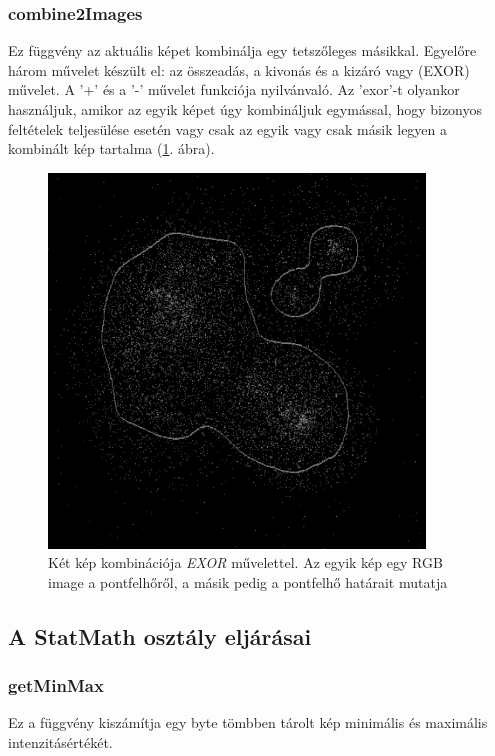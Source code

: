 \documentclass[a4paper,12pt]{article}
\begin{document}
\subsubsection{combine2Images}

Ez függvény az aktuális képet kombinálja egy tetszőleges másikkal. Egyelőre három művelet készült el: az összeadás, a kivonás és a kizáró vagy (EXOR) művelet. A '+' és a '-' művelet funkciója nyilvánvaló. Az 'exor'-t olyankor használjuk, amikor az egyik képet úgy kombináljuk egymással, hogy bizonyos feltételek teljesülése esetén vagy csak az egyik vagy csak másik legyen a kombinált kép tartalma (\ref{fig:datastock_cloud1}. ábra).

\begin{figure}
\centering
\includegraphics[width=10cm]{datastock_cloud1.png}
\caption{Két kép kombinációja \textit{EXOR} művelettel. Az egyik kép egy RGB image a pontfelhőről, a másik pedig a pontfelhő határait mutatja}
\label{fig:datastock_cloud1}
\end{figure}

\subsection{A \textbf{StatMath} osztály eljárásai}

\subsubsection{getMinMax}

Ez a függvény kiszámítja egy byte tömbben tárolt kép minimális és maximális intenzitásértékét.
\end{document}
